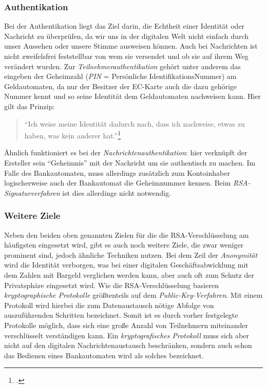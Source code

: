 \documentclass{scrarticle}
\begin{document}
    \subsubsection{Authentikation}
    Bei der Authentikation liegt das Ziel darin, die Echtheit einer Identität oder Nachricht zu überprüfen, da wir uns in der digitalen Welt nicht einfach durch unser Aussehen oder unsere Stimme ausweisen können. Auch bei Nachrichten ist nicht zweifelsfrei feststellbar von wem sie versendet und ob sie auf ihrem Weg verändert wurden. Zur \emph{Teilnehmerauthentikation} gehört unter anderem das eingeben der Geheimzahl (\emph{PIN} = Persönliche IdentifikationsNummer) am Geldautomaten, da nur der Besitzer der EC-Karte auch die dazu gehörige Nummer kennt und so seine Identität dem Geldautomaten nachweisen kann. Hier gilt das Prinzip:
    \begin{quote}
        \enquote{Ich weise meine Identität dadurch nach, dass ich nachweise, etwas zu haben, was kein anderer hat.}\footcite[19]{beutelspacher2015}
    \end{quote}
    Ähnlich funktioniert es bei der \emph{Nachrichtenauthentikation}: hier verknüpft der Ersteller sein \enquote{Geheimnis} mit der Nachricht um sie authentisch zu machen. Im Falle des Bankautomaten, muss allerdings zusätzlich zum Kontoinhaber logischerweise auch der Bankautomat die Geheimnummer kennen. Beim  \emph{RSA-Signaturverfahren} ist dies allerdings nicht notwendig.
    \subsubsection{Weitere Ziele}
    Neben den beiden oben genannten Zielen für die die RSA-Verschlüsselung am häufigsten eingesetzt wird, gibt es auch noch weitere Ziele, die zwar weniger prominent sind, jedoch ähnliche Techniken nutzen. Bei dem Zeil der \emph{Anonymität} wird die Identität verborgen, was bei einer digitalen Geschäftsabwicklung mit dem Zahlen mit Bargeld verglichen werden kann, aber auch oft zum Schutz der Privatsphäre eingesetzt wird. Wie die RSA-Verschlüsselung basieren \emph{kryptographische Protokolle} größtenteils auf dem \emph{Public-Key-Verfahren}. Mit einem Protokoll wird hierbei die zum Datenaustausch nötige Abfolge von auszuführenden Schritten bezeichnet. Somit ist es durch vorher festgelegte Protokolle möglich, dass sich eine große Anzahl von Teilnehmern miteinander verschlüsselt verständigen kann. Ein \emph{kryptografisches Protokoll} muss sich aber nicht auf den digitalen Nachrichtenaustausch beschränken, sondern auch schon das Bedienen eines Bankautomaten wird als solches bezeichnet.
\end{document}
